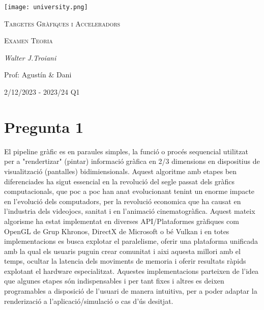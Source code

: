 \documentclass[12pt]{article}
\begin{document}
\begin{titlepage}
	\centering
	\texttt{[image: university.png]}\par\vspace{1cm}
	{\scshape\LARGE Targetes Gràfiques i Acceleradors \par}
	\vspace{1cm}
	{\scshape\Large Examen Teoria \par}
	\vspace{1.5cm}
	{\Large\itshape Walter J.Troiani\par}
	\vfill
	Prof: Agustín \& Dani \par
    \vspace{1cm}
    2/12/2023 - 2023/24 Q1\par
	\vspace{1cm}

\end{titlepage}

\newpage

\section{Pregunta 1}

El pipeline gràfic es en paraules simples, la funció o procés sequencial utilitzat per a "rendertizar" (pintar) informació gràfica en 2/3 dimensions en dispositius de visualització (pantalles)
bidimiensionals. Aquest algoritme amb etapes ben diferenciades ha sigut essencial en la revolució del segle passat dels gràfics computacionals, que poc a poc han anat evolucionant tenint un enorme impacte
en l'evolució dels computadors, per la revolució economica que ha causat en l'industria dels videojocs, sanitat i en l'animació cinematogràfica. Aquest mateix algorisme ha estat implementat
en diverses API/Plataformes gràfiques com OpenGL de Grup Khronos, DirectX de Microsoft o bé Vulkan i en totes implementacions es busca explotar el paralelisme, oferir una plataforma unificada
amb la qual els usuaris puguin crear comunitat i aixi aquesta millori amb el temps, ocultar la latencia dels moviments de memoria i oferir resultats ràpids explotant el hardware especialitzat.
Aquestes implementacions parteixen de l'idea que algunes etapes són indispensables i per tant fixes i altres es deixen programables a disposició de l'usuari de manera intuitiva, per a poder
adaptar la renderizació a l'aplicació/simulació o cas d'ús desitjat.
\\
\end{document}
